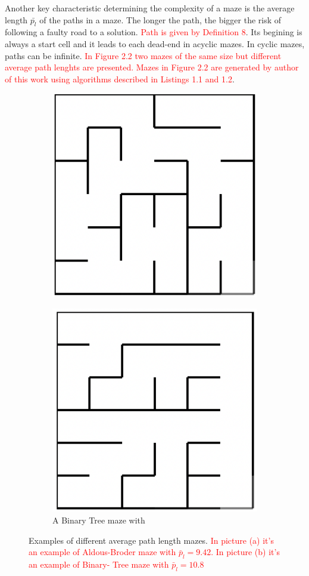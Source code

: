 \newline
Another key characteristic determining the complexity of a maze is the average length $\bar{p_l}$ of the paths in a maze. The longer the path, the bigger the risk of following a faulty road to a solution. \textcolor{red}{Path is given by Definition 8}. Its begining is always a start cell and it leads to each dead-end in acyclic mazes. In cyclic mazes, paths can be infinite. \textcolor{red}{In Figure 2.2 two mazes of the same size but different average path lenghts are presented. Mazes in Figure 2.2 are generated by author of this work using algorithms described in Listings 1.1 and 1.2}.
\newline
\begin{figure}[!h]
\centering
\begin{subfigure}{.5\textwidth}
\centering
\includegraphics[width=.5\linewidth]{aldous}
\caption{}
\label{fig:sub1}
\end{subfigure}%
\begin{subfigure}{.5\textwidth}
\centering
\includegraphics[width=.5\linewidth]{binary}
\caption{A Binary Tree maze with }
\label{fig:sub2}
\end{subfigure}
\caption{Examples of different average path length mazes. \textcolor{red}{In picture (a) it's an example of Aldous-Broder maze with $\bar{p}_l = 9.42$. In picture (b) it's an example of Binary- Tree maze with $\bar{p}_l = 10.8$}}
\label{fig:test}
\end{figure}

